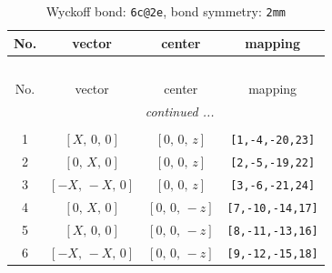 \documentclass[fleqn,8pt]{jsarticle}
\begin{document}
\begin{longtable}{cccc}
\caption{Wyckoff bond: {\tt 6c@2e}, bond symmetry: {\tt 2mm}}
 \\
 \hline \hline
No. & vector & center & mapping \\ \hline \endfirsthead

\multicolumn{3}{l}{\tablename\ \thetable{}} \\
 \hline \hline
No. & vector & center & mapping \\ \hline \endhead

 \hline \hline
\multicolumn{3}{r}{\footnotesize\it continued ...} \\ \endfoot

 \hline \hline
\multicolumn{3}{r}{} \\ \endlastfoot

1 & $\left[ X,\, 0,\, 0 \right]$ & $\left[ 0,\, 0,\, z \right]$ & {\tt [1,-4,-20,23]} \\ \hline
2 & $\left[ 0,\, X,\, 0 \right]$ & $\left[ 0,\, 0,\, z \right]$ & {\tt [2,-5,-19,22]} \\ \hline
3 & $\left[ - X,\, - X,\, 0 \right]$ & $\left[ 0,\, 0,\, z \right]$ & {\tt [3,-6,-21,24]} \\ \hline
4 & $\left[ 0,\, X,\, 0 \right]$ & $\left[ 0,\, 0,\, - z \right]$ & {\tt [7,-10,-14,17]} \\ \hline
5 & $\left[ X,\, 0,\, 0 \right]$ & $\left[ 0,\, 0,\, - z \right]$ & {\tt [8,-11,-13,16]} \\ \hline
6 & $\left[ - X,\, - X,\, 0 \right]$ & $\left[ 0,\, 0,\, - z \right]$ & {\tt [9,-12,-15,18]} \\
\end{longtable}
\renewcommand{\arraystretch}{1.2}
\end{document}
